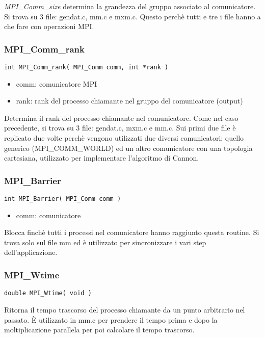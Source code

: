 \textit{MPI\_Comm\_size} determina la grandezza del gruppo associato al comunicatore. Si trova su 3 file: gendat.c, mm.c e mxm.c. Questo perch\`{e} tutti e tre i file hanno a che fare con operazioni MPI.

\subsubsection{MPI\_Comm\_rank}
\begin{lstlisting}
int MPI_Comm_rank( MPI_Comm comm, int *rank )
\end{lstlisting}
\begin{itemize}
  \item comm: comunicatore MPI
  \item rank: rank del processo chiamante nel gruppo del comunicatore (output)
\end{itemize}

Determina il rank del processo chiamante nel comunicatore. Come nel caso precedente, si trova su 3 file: gendat.c, mxm.c e mm.c. Sui primi due file \`{e} replicato due volte perch\`{e} vengono utilizzati due diversi comunicatori: quello generico (MPI\_COMM\_WORLD) ed un altro comunicatore con una topologia cartesiana, utilizzato per implementare l'algoritmo di Cannon.

\subsubsection{MPI\_Barrier}
\begin{lstlisting}
int MPI_Barrier( MPI_Comm comm )
\end{lstlisting}
\begin{itemize}
  \item comm: comunicatore
\end{itemize}

Blocca finch\`{e} tutti i processi nel comunicatore hanno raggiunto questa routine. Si trova solo sul file mm ed \`{e} utilizzato per sincronizzare i vari step dell'applicazione.

\subsubsection{MPI\_Wtime}
\begin{lstlisting}
double MPI_Wtime( void )
\end{lstlisting}

Ritorna il tempo trascorso del processo chiamante da un punto arbitrario nel passato. \`{E} utilizzato in mm.c per prendere il tempo prima e dopo la moltiplicazione parallela per poi calcolare il tempo trascorso.

